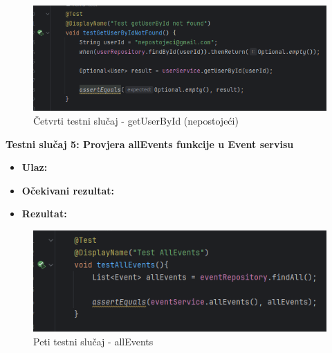 						\begin{figure}[H]
							\includegraphics[width=\textwidth]{slike/IKTest4.PNG} %
							\caption{Četvrti testni slučaj - getUserById (nepostojeći)}
							\label{fig:IKT4} %
						\end{figure}
						\eject
						
						
						
			\noindent \textbf{Testni slučaj 5: Provjera allEvents funkcije u Event servisu}
						\begin{itemize}
	
						\item[] \textbf{Ulaz: }
						\item[] \textbf{Očekivani rezultat: }
						\item[] \textbf{Rezultat: }
						\end{itemize}
						
						\begin{figure}[H]
							\includegraphics[width=\textwidth]{slike/IKTest5.PNG} %
							\caption{Peti testni slučaj - allEvents}
							\label{fig:IKT5} %
						\end{figure}
						\eject
						
